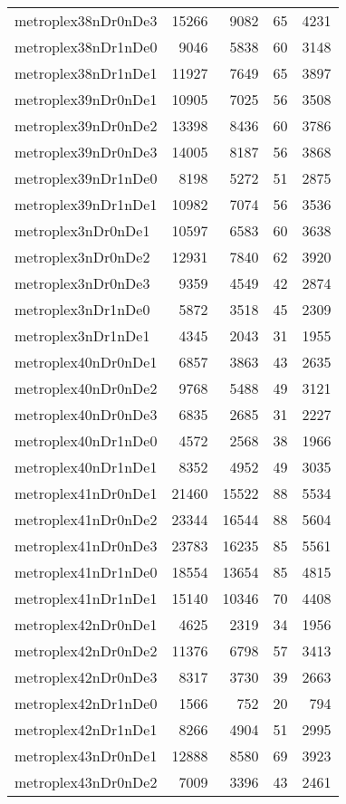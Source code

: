 \begin{tabular}{lrrrr}
metroplex38nDr0nDe3 & 15266 & 9082 & 65 & 4231 \\
metroplex38nDr1nDe0 & 9046 & 5838 & 60 & 3148 \\
metroplex38nDr1nDe1 & 11927 & 7649 & 65 & 3897 \\
metroplex39nDr0nDe1 & 10905 & 7025 & 56 & 3508 \\
metroplex39nDr0nDe2 & 13398 & 8436 & 60 & 3786 \\
metroplex39nDr0nDe3 & 14005 & 8187 & 56 & 3868 \\
metroplex39nDr1nDe0 & 8198 & 5272 & 51 & 2875 \\
metroplex39nDr1nDe1 & 10982 & 7074 & 56 & 3536 \\
metroplex3nDr0nDe1 & 10597 & 6583 & 60 & 3638 \\
metroplex3nDr0nDe2 & 12931 & 7840 & 62 & 3920 \\
metroplex3nDr0nDe3 & 9359 & 4549 & 42 & 2874 \\
metroplex3nDr1nDe0 & 5872 & 3518 & 45 & 2309 \\
metroplex3nDr1nDe1 & 4345 & 2043 & 31 & 1955 \\
metroplex40nDr0nDe1 & 6857 & 3863 & 43 & 2635 \\
metroplex40nDr0nDe2 & 9768 & 5488 & 49 & 3121 \\
metroplex40nDr0nDe3 & 6835 & 2685 & 31 & 2227 \\
metroplex40nDr1nDe0 & 4572 & 2568 & 38 & 1966 \\
metroplex40nDr1nDe1 & 8352 & 4952 & 49 & 3035 \\
metroplex41nDr0nDe1 & 21460 & 15522 & 88 & 5534 \\
metroplex41nDr0nDe2 & 23344 & 16544 & 88 & 5604 \\
metroplex41nDr0nDe3 & 23783 & 16235 & 85 & 5561 \\
metroplex41nDr1nDe0 & 18554 & 13654 & 85 & 4815 \\
metroplex41nDr1nDe1 & 15140 & 10346 & 70 & 4408 \\
metroplex42nDr0nDe1 & 4625 & 2319 & 34 & 1956 \\
metroplex42nDr0nDe2 & 11376 & 6798 & 57 & 3413 \\
metroplex42nDr0nDe3 & 8317 & 3730 & 39 & 2663 \\
metroplex42nDr1nDe0 & 1566 & 752 & 20 & 794 \\
metroplex42nDr1nDe1 & 8266 & 4904 & 51 & 2995 \\
metroplex43nDr0nDe1 & 12888 & 8580 & 69 & 3923 \\
metroplex43nDr0nDe2 & 7009 & 3396 & 43 & 2461 \\

\end{tabular}
